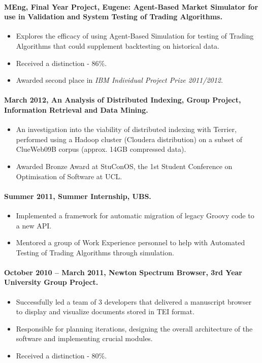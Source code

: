 \documentclass[11pt, a4paper]{article}
\newlength{\wideitemsep}
\let\olditem\item
\renewcommand{\item}{\setlength{\itemsep}{\wideitemsep}\olditem}
\begin{document}
\paragraph{MEng, Final Year Project, Eugene: Agent-Based Market Simulator for use in Validation and System Testing of Trading Algorithms.} 
\begin{itemize}
\item Explores the efficacy of using Agent-Based Simulation for testing of Trading Algorithms that could supplement backtesting on historical data.
\item Received a distinction - 86\%.
\item Awarded second place in \textit{IBM Individual Project Prize 2011/2012}.
\end{itemize}

\paragraph{March 2012, An Analysis of Distributed Indexing, Group Project, Information Retrieval and Data Mining.}
\begin{itemize}
\item An investigation into the viability of distributed indexing with Terrier, performed using a Hadoop cluster (Cloudera distribution) on a subset of ClueWeb09B corpus (approx. 14GB compressed data).
\item Awarded Bronze Award at StuConOS, the 1st Student Conference on Optimisation of Software at UCL.
\end{itemize}

\paragraph{Summer 2011, Summer Internship, UBS.}
\begin{itemize}
\item Implemented a framework for automatic migration of legacy Groovy code to a new API.
\item Mentored a group of Work Experience personnel to help with Automated Testing of Trading Algorithms through simulation.
\end{itemize}

\paragraph{October 2010 – March 2011, Newton Spectrum Browser, 3rd Year University Group Project.}
\begin{itemize}
\item Successfully led a team of 3 developers that delivered a manuscript browser to display and visualize documents stored in TEI format.
\item Responsible for planning iterations, designing the overall architecture of the software and implementing crucial modules. 
\item Received a distinction - 80\%.
\end{itemize}
\end{document}
